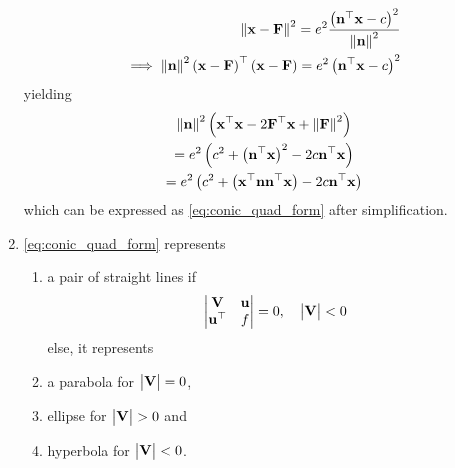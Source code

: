 \documentclass[journal,12pt,twocolumn]{IEEEtran}
\renewcommand\thesection{\arabic{section}}
\renewcommand\thesubsection{\thesection.\arabic{subsection}}
\begin{document}
\begin{enumerate}[label=\thesubsection.\arabic*.,ref=\thesubsection.\theenumi]
\begin{align}
			\left\lVert\mathbf{x}-\mathbf{F}\right\rVert^2=e^2 \frac{\left({\mathbf{n}^{\top}\mathbf{x} - c}\right)^2}{\left\lVert\mathbf{n}\right\rVert^2}\label{conics/30/eq:1} \\
			\implies \left\lVert\mathbf{n}\right\rVert^2\left(\mathbf{x}-\mathbf{F}\right)^{\top}\left(\mathbf{x}-\mathbf{F}\right)=e^2\left(\mathbf{n}^{\top}\mathbf{x} - c\right)^2
    \end{align}
    yielding
\begin{multline}
\left\lVert\mathbf{n}\right\rVert^2\left(\mathbf{x}^{\top}\mathbf{x}-2\mathbf{F}^{\top}\mathbf{x}+\left\lVert\mathbf{F}\right\rVert^2\right)
	\\
	=e^2\left(c^2+\left(\mathbf{n}^{\top}\mathbf{x} \right)^2-2c\mathbf{n}^{\top}\mathbf{x}\right) 
	\\
=e^2\left(c^2+\left(\mathbf{x}^{\top}\mathbf{n}\mathbf{n}^{\top}\mathbf{x} \right)-2c\mathbf{n}^{\top}\mathbf{x}\right)
\end{multline}
%
which can be expressed as \eqref{eq:conic_quad_form} after simplification.
\item \eqref{eq:conic_quad_form} represents 
	\begin{enumerate}
		\item a pair of straight lines if
\begin{align}
\begin{vmatrix}
\mathbf{V}&\mathbf{u}
\\
\mathbf{u}^{\top}&f
\end{vmatrix}
=  0, \quad \begin{vmatrix}\mathbf{V}\end{vmatrix} < 0
\label{eq:quad_forms_pair_det}
\end{align}
			else, it represents
		\item a parabola for $\begin{vmatrix}\mathbf{V}\end{vmatrix} = 0 $,
		\item ellipse for $\begin{vmatrix}\mathbf{V}\end{vmatrix} > 0 $ and 
		\item hyperbola for $\begin{vmatrix}\mathbf{V}\end{vmatrix} < 0 $.
	\end{enumerate}
\end{enumerate}
\end{document}
